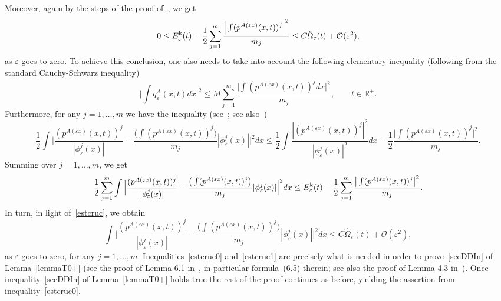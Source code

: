 \documentclass[11pt]{amsart}
\numberwithin{equation}{section}
\theoremstyle{definition}
\begin{document}
\noindent
Moreover, again by the steps of the proof of~\cite[Lemma 3.5]{selvit}, we get
\begin{equation}
	\label{estcruc}
0\leq E_{\varepsilon}^{{\rm k}}(t)-\frac{1}{2}\sum_{j=1}^m \frac{\Big|\int (p^{A({\varepsilon} x)}(x,t))^j \Big|^2}{m_j}
\leq C\hat\Omega_{\varepsilon}(t)+{\mathcal O}({\varepsilon}^2),
\end{equation}
as ${\varepsilon}$ goes to zero. To achieve this conclusion, one also needs to take into account
the following elementary inequality (following
from the standard Cauchy-Schwarz inequality)
$$
\Big| \int q^A_{\varepsilon}(x,t)dx  \Big|^2\leq M\sum_{j=1}^m\frac{\Big|\int (p^{A({\varepsilon} x)}(x,t))^j dx  \Big|^2}{m_j},
\qquad t\in{{\mathbb R}}^+.
$$
Furthermore, for any $j=1,\dots,m$ we have the inequality (see~\cite[inequality below
formula (28)]{selvit}; see also~\cite[formula (3.2)]{bronski})
$$
\frac{1}{2} \int \Big |\frac{(p^{A({\varepsilon} x)}(x,t))^j}{|\phi_{\varepsilon}^j(x)|}
-\frac{\big(\int (p^{A({\varepsilon} x)}(x,t))^j\big)}{m_j} |\phi_{\varepsilon}^j(x)|\Big|^2dx\leq
\frac{1}{2}\int \frac{|(p^{A({\varepsilon} x)}(x,t))^j|^2}{|\phi_{\varepsilon}^j(x)|^2}dx
-\frac{1}{2}\frac{\big|\int (p^{A({\varepsilon} x)}(x,t))^j \big|^2}{m_j}.
$$
Summing over $j=1,\dots,m$, we get
$$
\frac{1}{2}\sum_{j=1}^m  \int \Big |\frac{(p^{A({\varepsilon} x)}(x,t))^j}{|\phi_{\varepsilon}^j(x)|}
-\frac{\big(\int (p^{A({\varepsilon} x)}(x,t))^j\big)}{m_j} |\phi_{\varepsilon}^j(x)|\Big|^2dx\leq
E_{\varepsilon}^{{\rm k}}(t) -\frac{1}{2}\sum_{j=1}^m \frac{\big|\int (p^{A({\varepsilon} x)}(x,t))^j \big|^2}{m_j}.
$$
In turn, in light of~\eqref{estcruc}, we obtain
\begin{equation}
	\label{estcruc1}
\int \Big |\frac{(p^{A({\varepsilon} x)}(x,t))^j}{|\phi_{\varepsilon}^j(x)|}
-\frac{\big(\int (p^{A({\varepsilon} x)}(x,t))^j\big)}{m_j} |\phi_{\varepsilon}^j(x)|\Big|^2dx
\leq C\hat\Omega_{\varepsilon}(t)+{\mathcal O}({\varepsilon}^2),
\end{equation}
as ${\varepsilon}$ goes to zero, for any $j=1,\dots,m$. Inequalities~\eqref{estcruc0} and~\eqref{estcruc1} are
precisely what is needed in order to prove~\eqref{secDDIn} of Lemma~\ref{lemmaT0+} (see the proof of Lemma 6.1 in~\cite{squa},
in particular formula~(6.5) therein; see also the proof of Lemma 4.3 in~\cite{squamont}).
Once inequality~\eqref{secDDIn} of Lemma~\ref{lemmaT0+} holds true the rest of the proof
continues as before, yielding the assertion from inequality~\eqref{estcruc0}.
\end{document}
